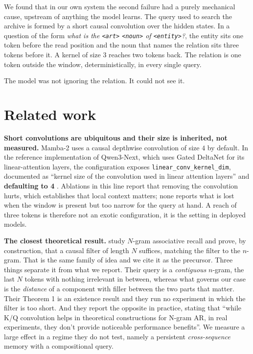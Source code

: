 \documentclass[11pt,a4paper]{article}
\begin{document}
We found that in our own system the second failure had a purely mechanical cause, upstream of anything
the model learns. The query used to search the archive is formed by a short causal convolution over the
hidden states. In a question of the form \emph{what is the \texttt{<art>} \texttt{<noun>} of
\texttt{<entity>}?}, the entity sits one token before the read position and the noun that names the
relation sits three tokens before it. A kernel of size $3$ reaches two tokens back. The relation is one
token outside the window, deterministically, in every single query.

The model was not ignoring the relation. It could not see it.

\section{Related work}

\textbf{Short convolutions are ubiquitous and their size is inherited, not measured.} Mamba-2
\citep{mamba2} uses a causal depthwise convolution of size $4$ by default. In the reference
implementation of Qwen3-Next, which uses Gated DeltaNet \citep{gateddeltanet} for its linear-attention
layers, the configuration exposes \texttt{linear\_conv\_kernel\_dim}, documented as ``kernel size of the
convolution used in linear attention layers'' and \textbf{defaulting to 4} \citep{qwen3next}. Ablations
in this line report that removing the convolution hurts, which establishes that local context matters;
none reports what is lost when the window is present but too narrow for the query at hand. A reach of
three tokens is therefore not an exotic configuration, it is the setting in deployed models.

\textbf{The closest theoretical result.} \citet{cat} study $N$-gram associative recall and prove, by
construction, that a causal filter of length $N$ suffices, matching the filter to the $n$-gram. That is
the same family of idea and we cite it as the precursor. Three things separate it from what we report.
Their query is a \emph{contiguous} $n$-gram, the last $N$ tokens with nothing irrelevant in between,
whereas what governs our case is the \emph{distance} of a component with filler between the two parts
that matter. Their Theorem 1 is an existence result and they run no experiment in which the filter is
too short. And they report the opposite in practice, stating that ``while K/Q convolution helps in
theoretical constructions for N-gram AR, in real experiments, they don't provide noticeable performance
benefits''. We measure a large effect in a regime they do not test, namely a persistent
\emph{cross-sequence} memory with a compositional query.
\end{document}

